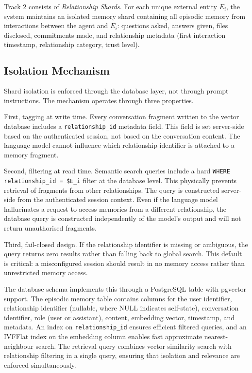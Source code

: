 \documentclass[11pt]{article}
\begin{document}
Track 2 consists of \emph{Relationship Shards}. For each unique external entity $E_i$, the system maintains an isolated memory shard containing all episodic memory from interactions between the agent and $E_i$: questions asked, answers given, files disclosed, commitments made, and relationship metadata (first interaction timestamp, relationship category, trust level).


\subsection{Isolation Mechanism}

Shard isolation is enforced through the database layer, not through prompt instructions. The mechanism operates through three properties.

First, tagging at write time. Every conversation fragment written to the vector database includes a \texttt{relationship\_id} metadata field. This field is set server-side based on the authenticated session, not based on the conversation content. The language model cannot influence which relationship identifier is attached to a memory fragment.

Second, filtering at read time. Semantic search queries include a hard \texttt{WHERE relationship\_id = \$E\_i} filter at the database level. This physically prevents retrieval of fragments from other relationships. The query is constructed server-side from the authenticated session context. Even if the language model hallucinates a request to access memories from a different relationship, the database query is constructed independently of the model's output and will not return unauthorised fragments.

Third, fail-closed design. If the relationship identifier is missing or ambiguous, the query returns zero results rather than falling back to global search. This default is critical: a misconfigured session should result in no memory access rather than unrestricted memory access.

The database schema implements this through a PostgreSQL table with pgvector support. The episodic memory table contains columns for the user identifier, relationship identifier (nullable, where NULL indicates self-state), conversation identifier, role (user or assistant), content, embedding vector, timestamp, and metadata. An index on \texttt{relationship\_id} ensures efficient filtered queries, and an IVFFlat index on the embedding column enables fast approximate nearest-neighbour search. The retrieval query combines vector similarity search with relationship filtering in a single query, ensuring that isolation and relevance are enforced simultaneously.
\end{document}
